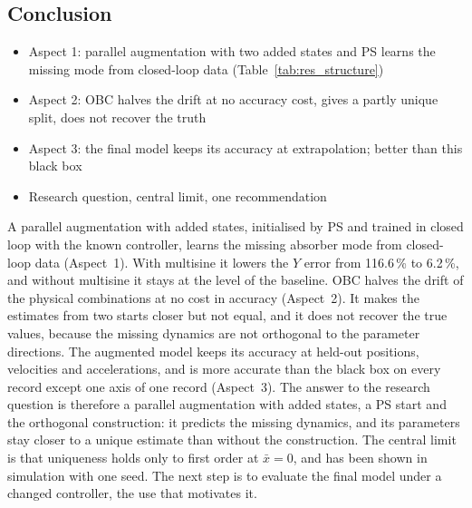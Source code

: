 \subsection{Conclusion}
\ifdraft
\begin{itemize}
\item Aspect 1: parallel augmentation with two added states and PS learns the missing mode from closed-loop data (Table~\ref{tab:res_structure})
\item Aspect 2: OBC halves the drift at no accuracy cost, gives a partly unique split, does not recover the truth
\item Aspect 3: the final model keeps its accuracy at extrapolation; better than this black box
\item Research question, central limit, one recommendation
\end{itemize}
\fi
A parallel augmentation with added states, initialised by PS and trained in
closed loop with the known controller, learns the missing absorber mode from
closed-loop data (Aspect~1).
With multisine it lowers the $Y$ error from 116.6\,\% to 6.2\,\%, and
without multisine it stays at the level of the baseline.
OBC halves the drift of the physical combinations at no cost in accuracy
(Aspect~2).
It makes the estimates from two starts closer but not equal, and it does
not recover the true values, because the missing dynamics are not orthogonal
to the parameter directions.
The augmented model keeps its accuracy at held-out positions, velocities and
accelerations, and is more accurate than the black box on every record
except one axis of one record (Aspect~3).
The answer to the research question is therefore a parallel augmentation
with added states, a PS start and the orthogonal construction: it predicts
the missing dynamics, and its parameters stay closer to a unique estimate
than without the construction.
The central limit is that uniqueness holds only to first order at
$\bar x=0$, and has been shown in simulation with one seed.
The next step is to evaluate the final model under a changed controller,
the use that motivates it.

